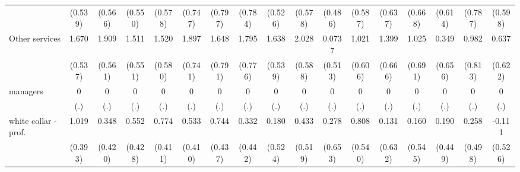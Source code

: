 {\begin{tabular}{l*{16}{c}}
                    &     (0.539)         &     (0.566)         &     (0.550)         &     (0.578)         &     (0.747)         &     (0.797)         &     (0.784)         &     (0.526)         &     (0.578)         &     (0.486)         &     (0.587)         &     (0.637)         &     (0.668)         &     (0.614)         &     (0.787)         &     (0.598)         \\
[1em]
Other services      &       1.670\sym{**} &       1.909\sym{***}&       1.511\sym{**} &       1.520\sym{**} &       1.897\sym{*}  &       1.648\sym{*}  &       1.795\sym{*}  &       1.638\sym{**} &       2.028\sym{***}&      0.0737         &       1.021         &       1.399\sym{*}  &       1.025         &       0.349         &       0.982         &       0.637         \\
                    &     (0.537)         &     (0.561)         &     (0.551)         &     (0.580)         &     (0.741)         &     (0.791)         &     (0.776)         &     (0.539)         &     (0.588)         &     (0.513)         &     (0.606)         &     (0.666)         &     (0.691)         &     (0.656)         &     (0.813)         &     (0.622)         \\
[1em]
managers            &           0         &           0         &           0         &           0         &           0         &           0         &           0         &           0         &           0         &           0         &           0         &           0         &           0         &           0         &           0         &           0         \\
                    &         (.)         &         (.)         &         (.)         &         (.)         &         (.)         &         (.)         &         (.)         &         (.)         &         (.)         &         (.)         &         (.)         &         (.)         &         (.)         &         (.)         &         (.)         &         (.)         \\
[1em]
white collar - prof.&       1.019\sym{**} &       0.348         &       0.552         &       0.774         &       0.533         &       0.744         &       0.332         &       0.180         &       0.433         &       0.278         &       0.808         &       0.131         &       0.160         &       0.190         &       0.258         &      -0.111         \\
                    &     (0.393)         &     (0.420)         &     (0.428)         &     (0.411)         &     (0.410)         &     (0.437)         &     (0.442)         &     (0.524)         &     (0.519)         &     (0.653)         &     (0.540)         &     (0.632)         &     (0.545)         &     (0.449)         &     (0.498)         &     (0.526)         \\

\end{tabular}}

